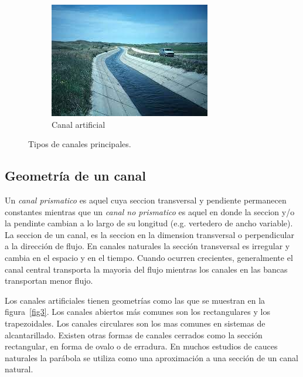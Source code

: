 \documentclass[11pt, oneside]{article}
\begin{document}
\begin{figure}
\begin{subfigure}[b]{0.45\textwidth}
         \includegraphics[width=\textwidth]{fig2b}
         \caption{Canal artificial}
         \label{fig2b}
     \end{subfigure}
      \caption{Tipos de canales principales.}
\end{figure}


\subsection{Geometr\'ia de un canal}
Un \emph{canal prismatico} es aquel cuya seccion transversal y pendiente permanecen constantes mientras que un \emph{canal no prismatico} es aquel en donde la seccion y/o la pendinte cambian a lo largo de su longitud (e.g. vertedero de ancho variable). La seccion de un canal, es la seccion en la dimension transversal o perpendicular a la direcci\'on de flujo. En  canales naturales la secci\'on transversal es irregular y cambia en el espacio y en el tiempo. Cuando ocurren crecientes, generalmente el canal central transporta la mayoria del flujo mientras los canales en las bancas transportan menor flujo.

Los canales artificiales tienen geometr\'ias como las que se muestran en la figura~\ref{fig3}. Los canales abiertos m\'as comunes son los rectangulares y los trapezoidales. Los canales circulares son los mas comunes en sistemas de alcantarillado. Existen otras formas de canales cerrados como la secci\'on rectangular, en forma de ovalo o de erradura. En muchos estudios de cauces naturales la par\'abola se utiliza como una aproximaci\'on a una secci\'on de un canal natural. 
\end{document}
